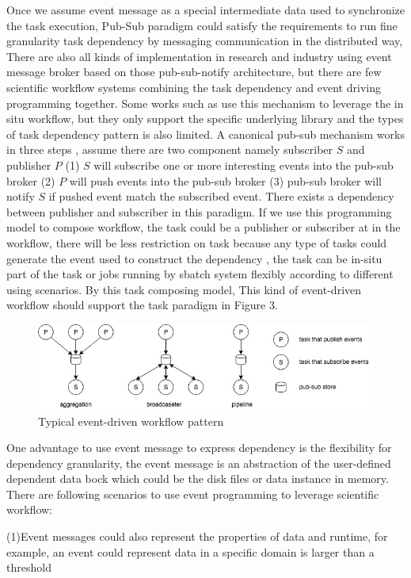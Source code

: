 Once we assume event message as a special intermediate data used to synchronize the task execution, Pub-Sub paradigm \cite{eugster2003many} could satisfy the requirements to run fine granularity task dependency by messaging communication in the distributed way, There are also all kinds of implementation in research and industry using event message broker based on those pub-sub-notify architecture\cite{hivemq,jin2012scalable,redispubsub}, but there are few scientific workflow systems combining the task dependency and event driving programming together. Some works such as \cite{jin2012scalable} use this mechanism to leverage the in situ workflow, but they only support the specific underlying library and the types of task dependency pattern is also limited. A canonical pub-sub mechanism works in three steps , assume there are two component namely subscriber $S$ and publisher $P$ (1) $S$ will subscribe one or more interesting events into the pub-sub broker (2) $P$ will push events into the pub-sub broker (3)  pub-sub broker will notify $S$ if pushed event match the subscribed event. There exists a dependency between publisher and subscriber in this paradigm. If we use this programming model to compose workflow, the task could be a publisher or subscriber at in the workflow, there will be less restriction on task because any type of tasks could generate the event used to construct the dependency , the task can be in-situ part of the task or jobs running by sbatch system flexibly according to different using scenarios. By this task composing model,  This kind of event-driven workflow should support the task paradigm in Figure 3.
\begin{figure} 
\centering
\includegraphics[width=.8\linewidth]{./figure/edtaskpattern.jpg}
\caption{Typical event-driven workflow pattern}
 \label{fg:state}
\end{figure} 
One advantage to use event message to express dependency is the flexibility for dependency granularity, the event message is an abstraction of the user-defined dependent data bock which could be the disk files or data instance in memory. 
There are following scenarios to use event programming to leverage scientific workflow:

(1)Event messages could also represent the properties of data and runtime, for example, an event could represent data in a specific domain is larger than a threshold

